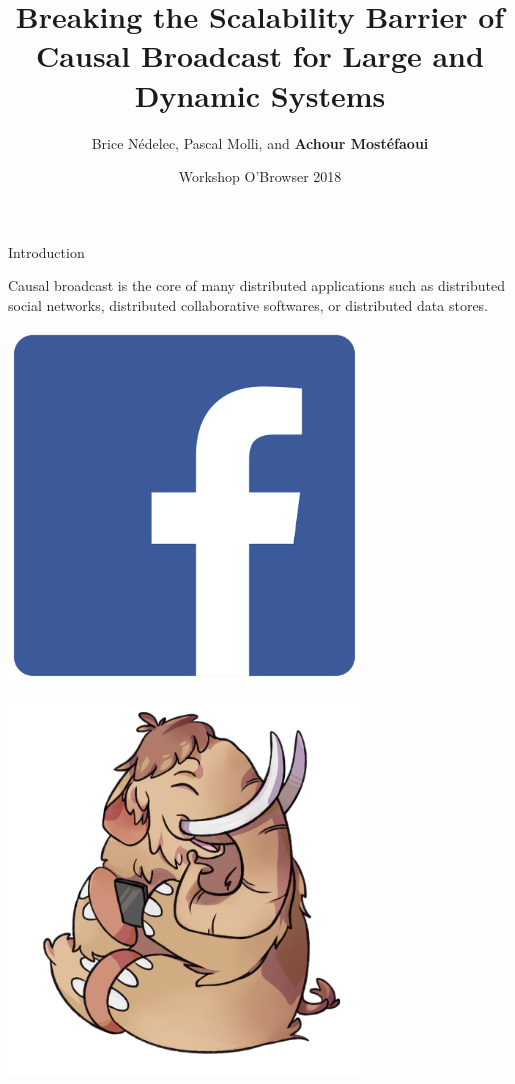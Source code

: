 \documentclass[10pt, xcolor={usenames, dvipsnames}]{beamer}
\title{Breaking the Scalability Barrier of Causal Broadcast for Large and Dynamic Systems}
\author{Brice N\'edelec, Pascal Molli, and \textbf{Achour Most{\'e}faoui}}
\date{Workshop O'Browser 2018}
\institute{University of Nantes, LS2N}
\begin{document}
\maketitle

\begin{frame}{Introduction}

  Causal broadcast is the core of many distributed applications such as
  distributed social networks, distributed collaborative softwares, or
  distributed data stores.

  \vspace{3em}
  
    \begin{minipage}{0.19\textwidth}
      \centering
      \includegraphics[width=0.7\textwidth]{logos/facebook.png}
    \end{minipage}
    \begin{minipage}{0.19\textwidth}
      \centering
      \includegraphics[width=0.7\textwidth]{logos/mastodon.png}

\end{minipage}
\end{frame}
\end{document}
